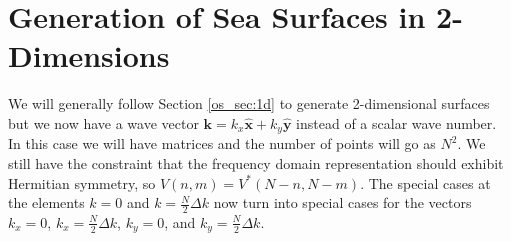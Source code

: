 \section{Generation of Sea Surfaces in 2-Dimensions}
We will generally follow Section \ref{os_sec:1d} to generate 2-dimensional surfaces but we now have a wave vector $\mathbf{k} = k_x\hat{\mathbf{x}} + k_y\hat{\mathbf{y}}$ instead of a scalar wave number. In this case we will have matrices and the number of points will go as $N^2$. We still have the constraint that the frequency domain representation should exhibit Hermitian symmetry, so $V(n,m) = V^*(N-n,N-m)$. The special cases at the elements $k = 0$ and $k = \frac{N}{2}\Delta k$ now turn into special cases for the vectors $k_x = 0$, $k_x = \frac{N}{2}\Delta k$, $k_y = 0$, and $k_y = \frac{N}{2}\Delta k$. 

